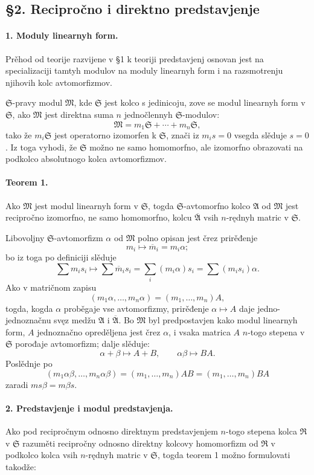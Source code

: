 \documentclass[11pt]{article}
\providecommand{\frM}{\mathfrak M}
\providecommand{\frR}{\mathfrak R}
\providecommand{\frS}{\mathfrak S}
\providecommand{\mA}{\mathfrak A}
\providecommand{\mbarA}{\overline{\mathfrak A}}
\begin{document}
\subsection*{§2. Recipročno i direktno predstavjenje}

\paragraph{1. Moduly linearnyh form.}
Prěhod od teorije razvijene v §1 k teoriji predstavjenj osnovan jest na specializaciji tamtyh modulov na moduly linearnyh form i na razsmotrenju njihovih kolc avtomorfizmov.

\(\frS\)-pravy modul \(\frM\), kde \(\frS\) jest kolco s jedinicoju, zove se modul linearnyh form v \(\frS\), ako \(\frM\) jest direktna suma \(n\) jednočlennyh \(\frS\)-modulov:
\[
        \frM=m_1\frS+\cdots+m_n\frS,
\]
tako že \(m_i\frS\) jest operatorno izomorfen k \(\frS\), znači iz \(m_i s=0\) vsegda slěduje \(s=0\). Iz toga vyhodi, že \(\frS\) možno ne samo homomorfno, ale izomorfno obrazovati na podkolco absolutnogo kolca avtomorfizmov.

\paragraph{Teorem 1.}
Ako \(\frM\) jest modul linearnyh form v \(\frS\), togda \(\frS\)-avtomorfno kolco \(\mA\) od \(\frM\) jest recipročno izomorfno, ne samo homomorfno, kolcu \(\mbarA\) vsih \(n\)-rędnyh matric v \(\frS\).

Libovoljny \(\frS\)-avtomorfizm \(\alpha\) od \(\frM\) polno opisan jest črez prirěđenje
\[
        m_i\longmapsto \overline m_i=m_i\alpha;
\]
bo iz toga po definiciji slěduje
\[
        \sum m_i s_i\longmapsto
        \sum \overline m_i s_i
        =\sum_i (m_i\alpha)s_i
        =\sum (m_i s_i)\alpha.
\]
Ako v matričnom zapisu
\[
        (m_1\alpha,\ldots,m_n\alpha)=(m_1,\ldots,m_n)A,
\]
togda, kogda \(\alpha\) proběgaje vse avtomorfizmy, prirěđenje \(\alpha\mapsto A\) daje jedno-jednoznačnu svęz medžu \(\mA\) i \(\mbarA\). Bo \(\frM\) byl predpostavjen kako modul linearnyh form, \(A\) jednoznačno opreděljena jest črez \(\alpha\), i vsaka matrica \(A\) \(n\)-togo stepena v \(\frS\) porođaje avtomorfizm; dalje slěduje:
\[
        \alpha+\beta\mapsto A+B,\qquad
        \alpha\beta\mapsto BA.
\]
Poslědnje po
\[
        (m_1\alpha\beta,\ldots,m_n\alpha\beta)
        =(m_1,\ldots,m_n)AB
        =(m_1,\ldots,m_n)BA
\]
zaradi \(ms\beta=m\beta s\).

\paragraph{2. Predstavjenje i modul predstavjenja.}
Ako pod recipročnym odnosno direktnym predstavjenjem \(n\)-togo stepena kolca \(\frR\) v \(\frS\) razuměti recipročny odnosno direktny kolcovy homomorfizm od \(\frR\) v podkolco kolca vsih \(n\)-rędnyh matric v \(\frS\), togda teorem 1 možno formulovati takodže:
\end{document}
